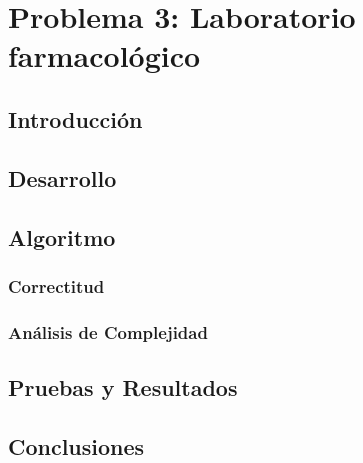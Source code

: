 \section{Problema 3: Laboratorio farmacol\'ogico}

\subsection{Introducci\'on}


\subsection{Desarrollo}



\subsection{Algoritmo} 



\subsubsection{Correctitud}



\subsubsection{Análisis de Complejidad}



\subsection{Pruebas y Resultados}


\subsection{Conclusiones}


